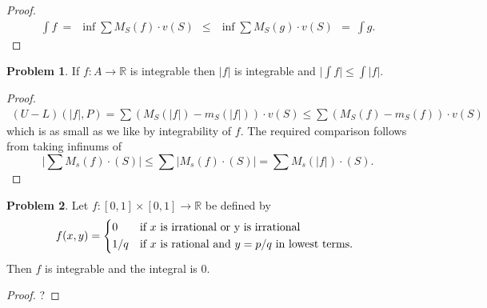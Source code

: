 \documentclass[20pt]{article}
\theoremstyle{plain}
\theoremstyle{definition}
\newtheorem*{problem}{Problem}
\newcommand{\reals}{\mathbb{R}}
\begin{document}
\begin{proof}
  \begin{align*}
  \int f \ =
  \ \ \inf \sum M_S(f) \cdot v(S)\ \  \leq
  \ \ \inf \sum M_S(g) \cdot v(S) \ \ =
  \ \int g.
  \end{align*}
\end{proof}


\begin{problem}
  If $f: A \to \reals$ is integrable then $|f|$ is integrable and
  $\big | \int f \big | \leq \int |f|.$
\end{problem}

\begin{proof}
  \begin{align*}
    (U-L)(|f|, P) = \sum (M_S(|f|) - m_S(|f|))\cdot v(S)
    \leq \sum (M_S(f) - m_S(f))\cdot v(S)
  \end{align*}
  which is as small as we like by integrability of $f$. The required comparison
  follows from taking infinums of
  $$\big | \sum M_s(f) \cdot(S) \big |  \leq
  \sum |M_s(f) \cdot(S)| =
  \sum M_s(|f|) \cdot(S).$$
\end{proof}

\begin{problem}{3.7}
  Let $f: [0, 1]\times[0,1] \to \reals$ be defined by
   \begin{equation*}
    f(x, y) =
    \begin{cases*}
      0 & if $x$ is irrational or y is irrational \\
      1/q & if $x$ is rational and $y=p/q$ in lowest terms.
    \end{cases*}
  \end{equation*}
  Then $f$ is integrable and the integral is $0.$
\end{problem}


\begin{proof}
  \color{ForestGreen}?
\end{proof}
\end{document}
